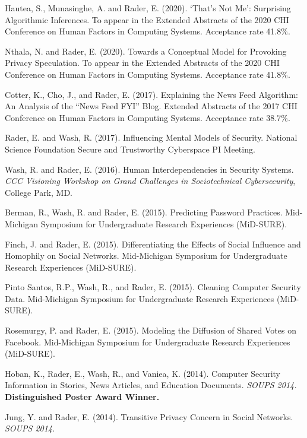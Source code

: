 \documentclass[9pt]{extarticle}
\makeatletter
\renewcommand{\section}{%
  \@startsection{section}{1}{0em}{\baselineskip}{3pt}{\large\bfseries\textsc}}
\makeatother
\begin{document}
\section{Extended Abstracts and Posters}

Hautea, S., Munasinghe, A. and Rader, E. (2020). `That's Not Me': Surprising Algorithmic Inferences. To appear in the Extended Abstracts of the 2020 CHI Conference on Human Factors in Computing Systems. Acceptance rate 41.8\%.

Nthala, N. and Rader, E. (2020). Towards a Conceptual Model for Provoking Privacy Speculation. To appear in the Extended Abstracts of the 2020 CHI Conference on Human Factors in Computing Systems. Acceptance rate 41.8\%.

Cotter, K., Cho, J., and Rader, E. (2017). Explaining the News Feed Algorithm: An Analysis of the ``News Feed FYI'' Blog. Extended Abstracts of the 2017 CHI Conference on Human Factors in Computing Systems. Acceptance rate 38.7\%.

Rader, E. and Wash, R. (2017). Influencing Mental Models of Security. National Science Foundation Secure and Trustworthy Cyberspace PI Meeting.

Wash, R. and Rader, E. (2016). Human Interdependencies in Security Systems. \emph{CCC Visioning Workshop on Grand Challenges in Sociotechnical Cybersecurity}, College Park, MD.

Berman, R., Wash, R. and Rader, E. (2015). Predicting Password Practices. Mid-Michigan Symposium for Undergraduate Research Experiences (MiD-SURE).

Finch, J. and Rader, E. (2015). Differentiating the Effects of Social Influence and Homophily on Social Networks. Mid-Michigan Symposium for Undergraduate Research Experiences (MiD-SURE).

Pinto Santos, R.P., Wash, R., and Rader, E. (2015). Cleaning Computer Security Data. Mid-Michigan Symposium for Undergraduate Research Experiences (MiD-SURE).

Rosemurgy, P. and Rader, E. (2015). Modeling the Diffusion of Shared Votes on Facebook. Mid-Michigan Symposium for Undergraduate Research Experiences (MiD-SURE).

Hoban, K., Rader, E., Wash, R., and Vaniea, K. (2014). Computer Security Information in Stories, News Articles, and Education Documents. \emph{SOUPS 2014.} \textbf{Distinguished Poster Award Winner.}

Jung, Y. and Rader, E. (2014). Transitive Privacy Concern in Social Networks. \emph{SOUPS 2014.}
\end{document}
